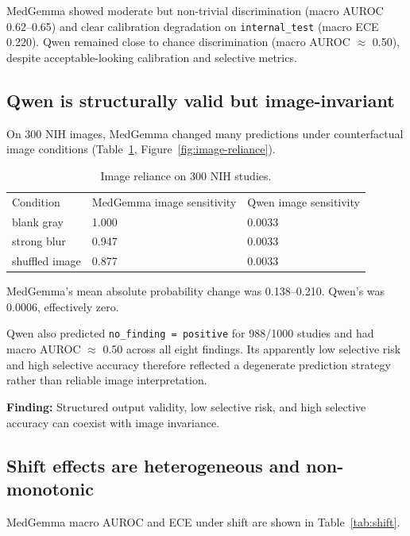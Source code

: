 MedGemma showed moderate but non-trivial discrimination (macro AUROC 0.62--0.65) and clear calibration degradation on \texttt{internal\_test} (macro ECE 0.220). Qwen remained close to chance discrimination (macro AUROC $\approx$ 0.50), despite acceptable-looking calibration and selective metrics.

\subsection{Qwen is structurally valid but image-invariant}

On 300 NIH images, MedGemma changed many predictions under counterfactual image conditions (Table~\ref{tab:image-reliance}, Figure~\ref{fig:image-reliance}).

\begin{table}[t]
\centering
\small
\begin{tabular}{lll}
\hline
Condition & MedGemma image sensitivity & Qwen image sensitivity \\
blank gray & 1.000 & 0.0033 \\
strong blur & 0.947 & 0.0033 \\
shuffled image & 0.877 & 0.0033 \\
\hline
\end{tabular}
\caption{Image reliance on 300 NIH studies.}
\label{tab:image-reliance}
\end{table}


MedGemma’s mean absolute probability change was 0.138--0.210. Qwen’s was 0.0006, effectively zero.

Qwen also predicted \texttt{no\_finding = positive} for 988/1000 studies and had macro AUROC $\approx$ 0.50 across all eight findings. Its apparently low selective risk and high selective accuracy therefore reflected a degenerate prediction strategy rather than reliable image interpretation.

\textbf{Finding:} Structured output validity, low selective risk, and high selective accuracy can coexist with image invariance.

\subsection{Shift effects are heterogeneous and non-monotonic}

MedGemma macro AUROC and ECE under shift are shown in Table~\ref{tab:shift}.

